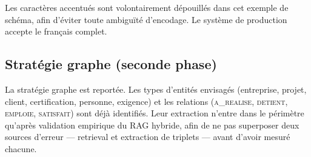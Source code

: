 Les caractères accentués sont volontairement dépouillés dans cet exemple
de schéma, afin d'éviter toute ambiguïté d'encodage. Le système de
production accepte le français complet.

\subsection{Stratégie graphe (seconde phase)}

La stratégie graphe est reportée. Les types d'entités envisagés
(entreprise, projet, client, certification, personne, exigence) et les
relations (\textsc{a\_realise}, \textsc{detient}, \textsc{emploie},
\textsc{satisfait}) sont déjà identifiés. Leur extraction n'entre dans le
périmètre qu'après validation empirique du RAG hybride, afin de ne pas
superposer deux sources d'erreur --- retrieval et extraction de triplets
--- avant d'avoir mesuré chacune.

